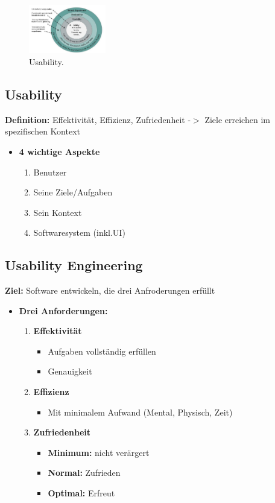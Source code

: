 \documentclass[../ZF_SWEN1.tex]{subfiles}
\begin{document}
\begin{figure}[H]
\centering
\includegraphics[width=0.3\textwidth]{Resources/Images/Usability.png}
\caption{\label{fig:Usability}Usability.}
\end{figure}


\subsection{Usability}
\textbf{Definition: } Effektivität, Effizienz, Zufriedenheit -$>$ Ziele erreichen im spezifischen Kontext \\

\begin{itemize}
	\item \textbf{4 wichtige Aspekte}
	\begin{enumerate}
		\item Benutzer
		\item Seine Ziele/Aufgaben
		\item Sein Kontext
		\item Softwaresystem (inkl.UI)
	\end{enumerate}
\end{itemize}


\subsection{Usability Engineering}

\textbf{Ziel: } Software entwickeln, die drei Anfroderungen erfüllt

\begin{itemize}
	\item \textbf{Drei Anforderungen: }
	\begin{enumerate}
		\item \textbf {Effektivität}
		\begin{itemize}
			\item Aufgaben vollständig erfüllen
			\item Genauigkeit
		\end{itemize}
	
		\item \textbf {Effizienz}
		\begin{itemize}
			\item Mit minimalem Aufwand (Mental, Physisch, Zeit)
		\end{itemize}
			\item \textbf { Zufriedenheit }
		\begin{itemize}
			\item \textbf{Minimum: } nicht verärgert
			\item \textbf{Normal: } Zufrieden
			\item \textbf{Optimal: } Erfreut
		\end{itemize}

	\end{enumerate}

\end{itemize}
\end{document}
